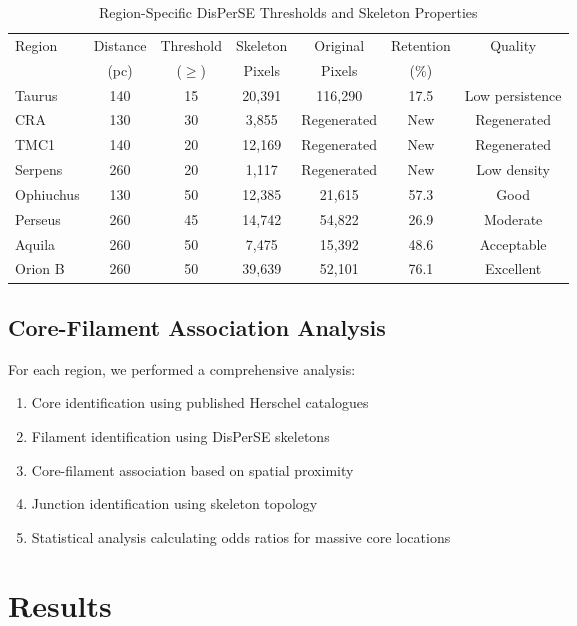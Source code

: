 \documentclass[11pt,a4paper]{article}
\begin{document}
\begin{table}[H]
\centering
\caption{Region-Specific DisPerSE Thresholds and Skeleton Properties}
\begin{tabular}{lcccccc}
\toprule
Region & Distance & Threshold & Skeleton & Original & Retention & Quality \\
      & (pc)   & ($\ge$) & Pixels  & Pixels  & (\%)  & \\
\midrule
Taurus   & 140     & 15  & 20,391   & 116,290  & 17.5  & Low persistence \\
CRA      & 130     & 30  & 3,855    & Regenerated & New     & Regenerated \\
TMC1     & 140     & 20  & 12,169   & Regenerated & New     & Regenerated \\
Serpens  & 260     & 20  & 1,117    & Regenerated & New     & Low density \\
Ophiuchus& 130     & 50  & 12,385   & 21,615  & 57.3   & Good \\
Perseus  & 260     & 45  & 14,742   & 54,822  & 26.9   & Moderate \\
Aquila   & 260     & 50  & 7,475    & 15,392  & 48.6   & Acceptable \\
Orion B  & 260     & 50  & 39,639   & 52,101  & 76.1   & Excellent \\
\bottomrule
\end{tabular}
\end{table}

\subsection{Core-Filament Association Analysis}

For each region, we performed a comprehensive analysis:
\begin{enumerate}
    \item Core identification using published Herschel catalogues
    \item Filament identification using DisPerSE skeletons
    \item Core-filament association based on spatial proximity
    \item Junction identification using skeleton topology
    \item Statistical analysis calculating odds ratios for massive core locations
\end{enumerate}

\section{Results}
\end{document}
